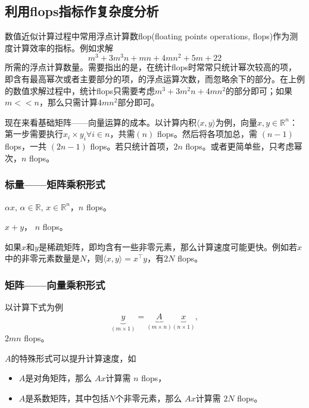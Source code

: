 \begin{subappendices}
\subsection*{利用flops指标作复杂度分析}
数值近似计算过程中常用浮点计算数flop(floating points operations, flops)作为测度计算效率的指标。例如求解
\begin{equation*}
  m^{3} + 3 m^{3} n + mn + 4 m n^{2} + 5m + 22
\end{equation*}
所需的浮点计算数量。需要指出的是，在统计flops时常常只统计幂次较高的项，即含有最高幂次或者主要部分的项，的浮点运算次数，而忽略余下的部分。在上例的数值求解过程中，统计flops只需要考虑$m^{3} + 3 m^{2} n + 4 m n^{2}$的部分即可；如果$m << n$，那么只需计算$4 m n^{2}$部分即可。

现在来看基础矩阵——向量运算的成本。以计算内积$\langle x, y \rangle$为例，向量$x,y \in \mathbb{R}^{n}$：第一步需要执行$x_{i} \times y_{i} \forall i \in n$，共需$(n)$ flops。然后将各项加总，需 $(n-1)$ flops，一共 $(2n-1)$ flops。若只统计首项，$2n$ flops。或者更简单些，只考虑幂次，$n$ flops。

\subsubsection*{标量——矩阵乘积形式}
$\alpha x, \, \alpha \in \mathbb{R}, \, x \in \mathbb{R}^{n}$，$n$ flops。

$x + y$， $n$ flops。

如果$x$和$y$是稀疏矩阵，即均含有一些非零元素，那么计算速度可能更快。例如若$x$中的非零元素数量是$N$，则$\langle x,y \rangle = x^{\top} y $，有$2N$ flops。

\subsubsection*{矩阵——向量乘积形式}
以计算下式为例
\begin{equation*}
  \underbrace{y}_{\left( m \times 1 \right)}
  = \underbrace{A}_{\left( m \times n \right)}
  \underbrace{x}_{\left( n \times 1 \right)},
\end{equation*}
$2 mn$ flops。

$A$的特殊形式可以提升计算速度，如
\begin{itemize}
  \item $A$是对角矩阵，那么 $A x$计算需 $n$ flops，
  \item $A$是系数矩阵，其中包括$N$个非零元素，那么 $A x$计算需 $2N$ flops。
\end{itemize}


\end{subappendices}
